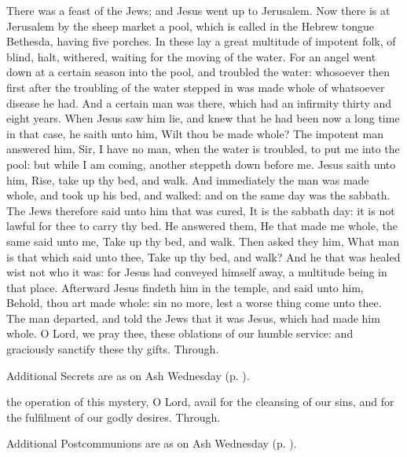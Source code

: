  There was a feast of the Jews; and Jesus went up to Jerusalem. Now there is at Jerusalem by the sheep market a pool, which is called in the Hebrew tongue Bethesda, having five porches. In these lay a great multitude of impotent folk, of blind, halt, withered, waiting for the moving of the water. For an angel went down at a certain season into the pool, and troubled the water: whosoever then first after the troubling of the water stepped in was made whole of whatsoever disease he had. And a certain man was there, which had an infirmity thirty and eight years. When Jesus saw him lie, and knew that he had been now a long time in that case, he saith unto him, Wilt thou be made whole? The impotent man answered him, Sir, I have no man, when the water is troubled, to put me into the pool: but while I am coming, another steppeth down before me. Jesus saith unto him, Rise, take up thy bed, and walk. And immediately the man was made whole, and took up his bed, and walked: and on the same day was the sabbath. The Jews therefore said unto him that was cured, It is the sabbath day: it is not lawful for thee to carry thy bed. He answered them, He that made me whole, the same said unto me, Take up thy bed, and walk. Then asked they him, What man is that which said unto thee, Take up thy bed, and walk? And he that was healed wist not who it was: for Jesus had conveyed himself away, a multitude being in that place. Afterward Jesus findeth him in the temple, and said unto him, Behold, thou art made whole: sin no more, lest a worse thing come unto thee. The man departed, and told the Jews that it was Jesus, which had made him whole.
\secret
{} O Lord, we pray thee, these oblations of our humble service: and graciously sanctify these thy gifts. Through.
\begin{rubric}
    Additional Secrets are as on Ash Wednesday (p. \pageref{AshWednesdayMass}).
\end{rubric}
\postcommunion
{} the operation of this mystery, O Lord, avail for the cleansing of our sins, and for the fulfilment of our godly desires. Through.\\
\begin{rubric}
    Additional Postcommunions are as on Ash Wednesday (p. \pageref{AshWednesdayMass}).
\end{rubric}

